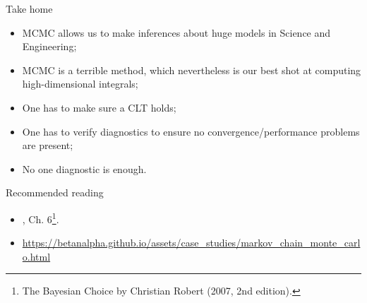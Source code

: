 \begin{frame}{Take home}
\begin{itemize}
 \item MCMC allows us to make inferences about huge models in Science and Engineering;
 \item MCMC is a terrible method, which nevertheless is our best shot at computing high-dimensional integrals;
 \item One has to make sure a CLT holds;
 \item One has to verify diagnostics to ensure no convergence/performance problems are present;
 \item No one diagnostic is enough.
\end{itemize}
\end{frame}
\begin{frame}{Recommended reading}
\begin{itemize}
  \item[\faBook] \cite{Robert2007}, Ch. 6\footnote{The Bayesian Choice by Christian Robert (2007, 2nd edition).}.
  \item[\faBook] \url{https://betanalpha.github.io/assets/case_studies/markov_chain_monte_carlo.html}
 \end{itemize} 
\end{frame}
